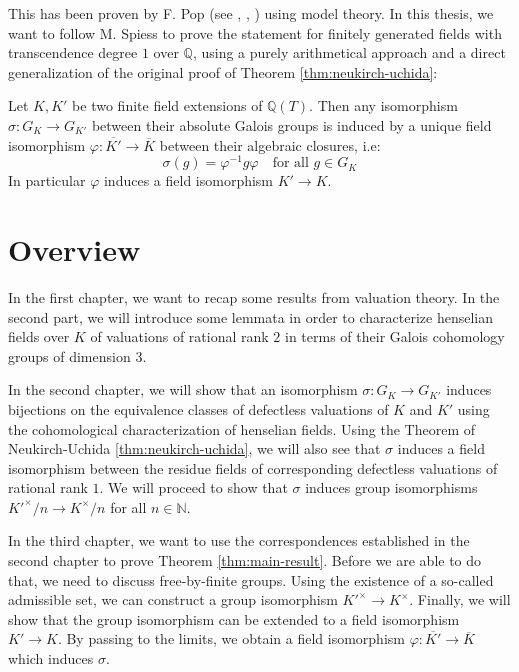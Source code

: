 This has been proven by F. Pop (see \cite{Po90}, \cite{Po94}, \cite{Po95}) using model theory. In this thesis, we want to follow M. Spiess \cite{Sp96} to prove the statement for finitely generated fields with transcendence degree $1$ over $\mathbb{Q}$, using a purely arithmetical approach and a direct generalization of the original proof of Theorem \ref{thm:neukirch-uchida}:

\pagebreak

\begin{theorem}\label{thm:main-result}
Let $K,K'$ be two finite field extensions of $\mathbb{Q}(T)$. Then any isomorphism $\sigma:G_K\to G_{K'}$ between their absolute Galois groups is induced by a unique field isomorphism $\varphi:\overline{K'}\to\overline{K}$ between their algebraic closures, i.e: 
\[\sigma(g) =\varphi^{-1}g\varphi \quad \text{for all }g\in G_K\]
In particular $\varphi$ induces a field isomorphism $K'\to K$.
\end{theorem}

\section{Overview}

In the first chapter, we want to recap some results from valuation theory. In the second part, we will introduce some lemmata in order to characterize henselian fields over $K$ of valuations of rational rank $2$ in terms of their Galois cohomology groups of dimension $3$.

In the second chapter, we will show that an isomorphism $\sigma: G_K\to G_{K'}$ induces bijections on the equivalence classes of defectless valuations of $K$ and $K'$ using the cohomological characterization of henselian fields. Using the Theorem of Neukirch-Uchida \ref{thm:neukirch-uchida}, we will also see that $\sigma$ induces a field isomorphism between the residue fields of corresponding defectless valuations of rational rank $1$. We will proceed to show that $\sigma$ induces group isomorphisms $K'^\times/n\to K^\times/n$ for all $n\in\mathbb{N}$.

In the third chapter, we want to use the correspondences established in the second chapter to prove Theorem \ref{thm:main-result}. Before we are able to do that, we need to discuss free-by-finite groups. Using the existence of a so-called admissible set, we can construct a group isomorphism $K'^\times\to K^\times$. Finally, we will show that the group isomorphism can be extended to a field isomorphism $K'\to K$. By passing to the limits, we obtain a field isomorphism $\varphi: \overline{K'}\to\overline{K}$ which induces $\sigma$.

